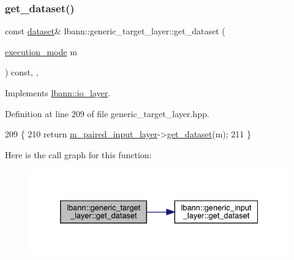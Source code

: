 \subsubsection{\texorpdfstring{get\+\_\+dataset()}{get\_dataset()}\hspace{0.1cm}{\footnotesize\ttfamily [2/2]}}
{\footnotesize\ttfamily const \hyperlink{classlbann_1_1dataset}{dataset}\& lbann\+::generic\+\_\+target\+\_\+layer\+::get\+\_\+dataset (\begin{DoxyParamCaption}\item[{\hyperlink{base_8hpp_a2781a159088df64ed7d47cc91c4dc0a8}{execution\+\_\+mode}}]{m }\end{DoxyParamCaption}) const\hspace{0.3cm}{\ttfamily [inline]}, {\ttfamily [override]}, {\ttfamily [virtual]}}



Implements \hyperlink{classlbann_1_1io__layer_ac46dfddf41dc6915db433fe269b53770}{lbann\+::io\+\_\+layer}.



Definition at line 209 of file generic\+\_\+target\+\_\+layer.\+hpp.


\begin{DoxyCode}
209                                                               \{
210     \textcolor{keywordflow}{return} \hyperlink{classlbann_1_1generic__target__layer_a84da1260e9feb4fbc3e6f2315e4cab4b}{m\_paired\_input\_layer}->\hyperlink{classlbann_1_1generic__input__layer_af5699540797c22d8846028e578a6fc59}{get\_dataset}(m);
211   \}
\end{DoxyCode}
Here is the call graph for this function\+:\nopagebreak
\begin{figure}[H]
\begin{center}
\leavevmode
\includegraphics[width=332pt]{classlbann_1_1generic__target__layer_a76569f34b5af75d6b822fb3349f7406f_cgraph}
\end{center}
\end{figure}
\mbox{\label{classlbann_1_1generic__target__layer_aa2db5ccc0bbd40f081c8ff4501f3fc29}} 
